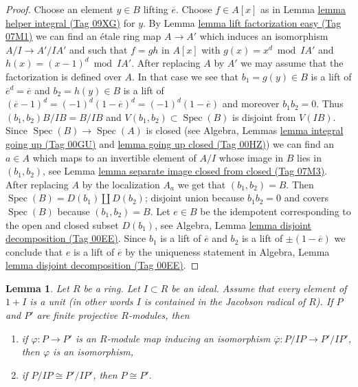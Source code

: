 \documentclass{amsart}
\theoremstyle{plain}
\newtheorem{lemma}[subsection]{Lemma}
\theoremstyle{definition}
\theoremstyle{remark}
\numberwithin{equation}{subsection}
\def\Spec{\mathop{\mathrm{Spec}}}
\begin{document}
\begin{proof}
Choose an element $y \in B$ lifting $\overline{e}$.
Choose $f \in A[x]$ as in Lemma \href{https://stacks.math.columbia.edu/tag/09XG}{lemma helper integral (Tag 09XG)} for $y$.
By Lemma \href{https://stacks.math.columbia.edu/tag/07M1}{lemma lift factorization easy (Tag 07M1)}
we can find an \'etale ring map $A \to A'$ which induces
an isomorphism $A/I \to A'/IA'$ and such that $f = gh$
in $A[x]$ with $g(x) = x^d \bmod IA'$ and $h(x) = (x - 1)^d \bmod IA'$.
After replacing $A$ by $A'$ we may assume that the factorization
is defined over $A$. In that case we see that
$b_1 = g(y) \in B$ is a lift of $\overline{e}^d = \overline{e}$ and
$b_2 = h(y) \in B$ is a lift of
$(\overline{e} - 1)^d = (-1)^d (1 - \overline{e})^d = (-1)^d(1 - \overline{e})$
and moreover $b_1b_2 = 0$. Thus $(b_1, b_2)B/IB = B/IB$ and
$V(b_1, b_2) \subset \Spec(B)$ is disjoint from $V(IB)$. Since
$\Spec(B) \to \Spec(A)$ is closed (see
Algebra, Lemmas \href{https://stacks.math.columbia.edu/tag/00GU}{lemma integral going up (Tag 00GU)} and
\href{https://stacks.math.columbia.edu/tag/00HZ}{lemma going up closed (Tag 00HZ)})
we can find an $a \in A$ which maps to an invertible element
of $A/I$ whose image in $B$ lies in $(b_1, b_2)$, see
Lemma \href{https://stacks.math.columbia.edu/tag/07M3}{lemma separate image closed from closed (Tag 07M3)}.
After replacing $A$ by the localization $A_a$ we get that
$(b_1, b_2) = B$. Then $\Spec(B) = D(b_1) \amalg D(b_2)$;
disjoint union because $b_1b_2 = 0$ and covers
$\Spec(B)$ because $(b_1, b_2) = B$. Let $e \in B$ be the idempotent
corresponding to the open and closed subset $D(b_1)$, see
Algebra, Lemma \href{https://stacks.math.columbia.edu/tag/00EE}{lemma disjoint decomposition (Tag 00EE)}.
Since $b_1$ is a lift of $\overline{e}$ and $b_2$ is a
lift of $\pm (1 - \overline{e})$ we conclude that $e$ is
a lift of $\overline{e}$ by the uniqueness statement in
Algebra, Lemma \href{https://stacks.math.columbia.edu/tag/00EE}{lemma disjoint decomposition (Tag 00EE)}.
\end{proof}


\begin{lemma}
\label{more-algebra-lemma-isomorphic-finite-projective-lifts}
Let $R$ be a ring. Let $I \subset R$ be an ideal. Assume that
every element of $1 + I$ is a unit (in other words $I$ is contained
in the Jacobson radical of $R$). If $P$ and $P'$ are finite
projective $R$-modules, then
\begin{enumerate}
\item if $\varphi : P \to P'$ is an $R$-module map inducing an
isomorphism $\overline{\varphi} : P/IP \to P'/IP'$, then $\varphi$
is an isomorphism,
\item if $P/IP \cong P'/IP'$, then $P \cong P'$.
\end{enumerate}
\end{lemma}
\end{document}
